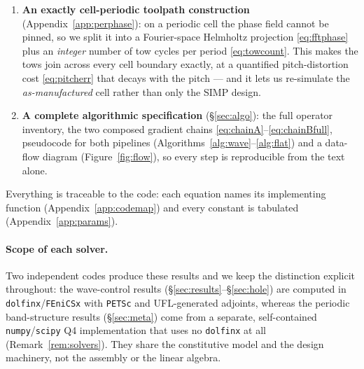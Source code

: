 \documentclass[11pt]{article}
\begin{document}
\begin{enumerate}
the same orthotropic model on a periodic Bloch cell, with \emph{topology} (density)
and \emph{toolpath} (orientation) optimized \emph{together} --- via eigenvalue
sensitivities and KS aggregation --- to flatten a chosen band and isolate it by a
gap, neither design field alone sufficing.
\item \textbf{An exactly cell-periodic toolpath construction}
(Appendix~\ref{app:perphase}): on a periodic cell the phase field cannot be pinned,
so we split it into a Fourier-space Helmholtz projection \eqref{eq:fftphase} plus
an \emph{integer} number of tow cycles per period \eqref{eq:towcount}. This makes
the tows join across every cell boundary exactly, at a quantified pitch-distortion
cost \eqref{eq:pitcherr} that decays with the pitch --- and it lets us re-simulate
the \emph{as-manufactured} cell rather than only the SIMP design.
\item \textbf{A complete algorithmic specification} (\S\ref{sec:algo}): the full
operator inventory, the two composed gradient chains
\eqref{eq:chainA}--\eqref{eq:chainBfull}, pseudocode for both pipelines
(Algorithms~\ref{alg:wave}--\ref{alg:flat}) and a data-flow diagram
(Figure~\ref{fig:flow}), so every step is reproducible from the text alone.
\end{enumerate}
Everything is traceable to the code: each equation names its implementing function
(Appendix~\ref{app:codemap}) and every constant is tabulated
(Appendix~\ref{app:params}).

\paragraph{Scope of each solver.} Two independent codes produce these results and
we keep the distinction explicit throughout: the wave-control results
(\S\ref{sec:results}--\S\ref{sec:hole}) are computed in
\texttt{dolfinx}/\texttt{FEniCSx} with \texttt{PETSc} and UFL-generated adjoints,
whereas the periodic band-structure results (\S\ref{sec:meta}) come from a separate,
self-contained \texttt{numpy}/\texttt{scipy} Q4 implementation that uses no
\texttt{dolfinx} at all (Remark~\ref{rem:solvers}). They share the constitutive
model and the design machinery, not the assembly or the linear algebra.
\end{document}
